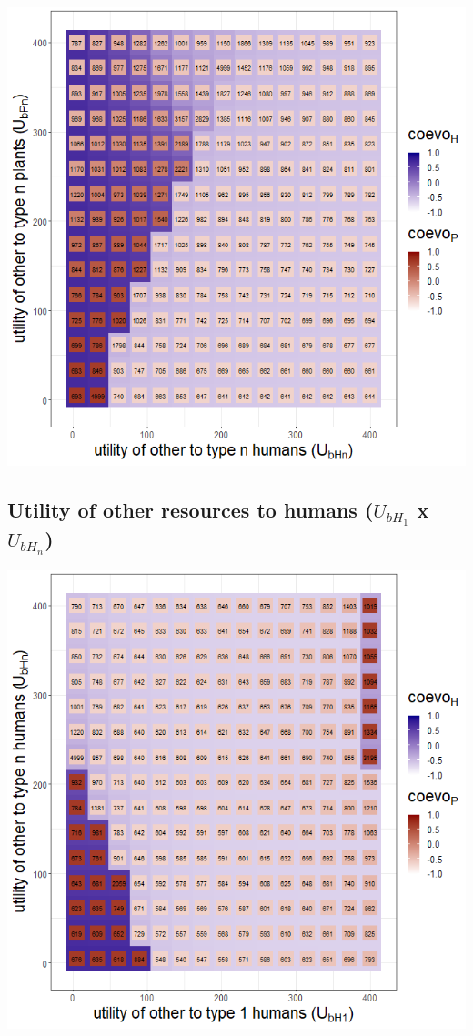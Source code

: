 \documentclass[
]{book}
\begin{document}
\includegraphics[width=1\linewidth]{plots/3_exp_utility_other_to_type_n-tripleRaster_twoParameters}

\newpage

\hypertarget{utility-of-other-resources-to-humans-u_bh_1-x-u_bh_n}{%
\subsection{\texorpdfstring{Utility of other resources to humans (\(U_{bH_{1}}\) x \(U_{bH_{n}}\))}{Utility of other resources to humans (U\_\{bH\_\{1\}\} x U\_\{bH\_\{n\}\})}}\label{utility-of-other-resources-to-humans-u_bh_1-x-u_bh_n}}


\includegraphics[width=1\linewidth]{plots/3_exp_utility_other_to_type_humans-tripleRaster_twoParameters}
\end{document}
